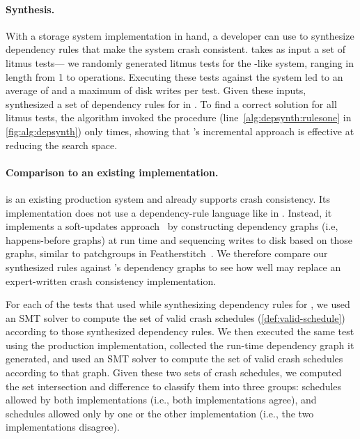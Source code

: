 \paragraph{Synthesis.}
With a storage system implementation in hand,
a developer can use \depsynth to synthesize dependency rules that make the system crash consistent.
\depsynth takes as input a set of litmus tests---%
we randomly generated \shardstoreinputtests{} litmus tests for the \shardstore-like system,
ranging in length from 1 to \shardstoremaxops operations.
Executing these tests against the system
led to an average of \shardstoreavgwrites and a maximum of \shardstoremaxwrites disk writes per test.
Given these inputs, \depsynth synthesized a set of \shardstorenumrules dependency rules for \shardstore
in \shardstoresynthesistime.
To find a correct solution for all \shardstoreinputtests litmus tests,
the \depsynth algorithm invoked the  procedure (line~\ref{alg:depsynth:rulesone} in \cref{fig:alg:depsynth})
only \shardstoretestsused times, showing that \depsynth's incremental approach is effective at reducing the search space.\tighten

\paragraph{Comparison to an existing implementation.}
\shardstore is an existing production system and
already supports crash consistency.
Its implementation does not use a dependency-rule language like in \depsynth. 
Instead, it implements a soft-updates approach~\cite{ganger:soft-updates}
by constructing dependency graphs (i.e, happens-before graphs) at run time
and sequencing writes to disk based on those graphs,
similar to patchgroups in Featherstitch~\cite{frost:featherstitch}.
We therefore compare our synthesized rules against \shardstore's dependency graphs
to see how well \depsynth may replace an expert-written crash consistency implementation.

For each of the \shardstoretestsused{} tests that \depsynth used while synthesizing dependency rules for \shardstore,
we used an SMT solver to compute the set of valid crash schedules (\cref{def:valid-schedule})
according to those synthesized dependency rules.
We then executed the same test using the production \shardstore implementation,
collected the run-time dependency graph it generated,
and used an SMT solver to compute the set of valid crash schedules according to that graph.
Given these two sets of crash schedules,
we computed the set intersection and difference to classify them into three groups:
schedules allowed by both implementations (i.e., both implementations agree),
and schedules allowed only by one or the other implementation (i.e., the two implementations disagree).\tighten


